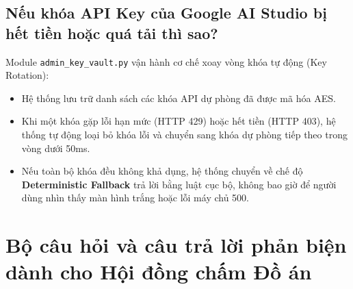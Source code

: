\documentclass[12pt,a4paper]{article}
\begin{document}
\subsection{Nếu khóa API Key của Google AI Studio bị hết tiền hoặc quá tải thì sao?}
Module \texttt{admin\_key\_vault.py} vận hành cơ chế xoay vòng khóa tự động (Key Rotation):
\begin{itemize}[leftmargin=1.5em]
    \item Hệ thống lưu trữ danh sách các khóa API dự phòng đã được mã hóa AES.
    \item Khi một khóa gặp lỗi hạn mức (HTTP 429) hoặc hết tiền (HTTP 403), hệ thống tự động loại bỏ khóa lỗi và chuyển sang khóa dự phòng tiếp theo trong vòng dưới 50ms.
    \item Nếu toàn bộ khóa đều không khả dụng, hệ thống chuyển về chế độ \textbf{Deterministic Fallback} trả lời bằng luật cục bộ, không bao giờ để người dùng nhìn thấy màn hình trắng hoặc lỗi máy chủ 500.
\end{itemize}

\section{Bộ câu hỏi và câu trả lời phản biện dành cho Hội đồng chấm Đồ án}
\end{document}
